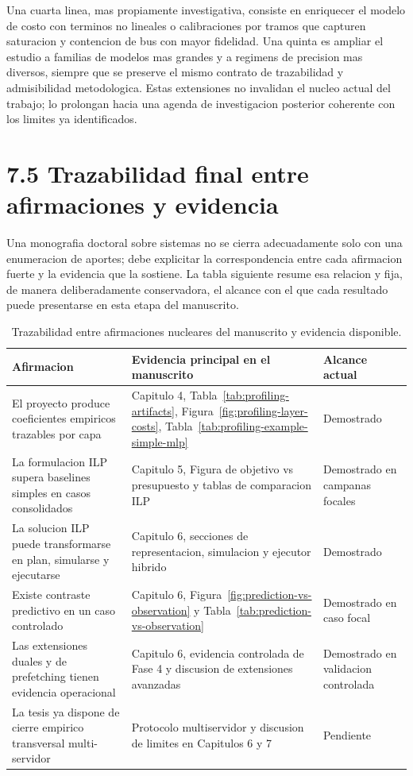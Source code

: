 Una cuarta linea, mas propiamente investigativa, consiste en enriquecer el modelo de costo con terminos no lineales o calibraciones por tramos que capturen saturacion y contencion de bus con mayor fidelidad. Una quinta es ampliar el estudio a familias de modelos mas grandes y a regimens de precision mas diversos, siempre que se preserve el mismo contrato de trazabilidad y admisibilidad metodologica. Estas extensiones no invalidan el nucleo actual del trabajo; lo prolongan hacia una agenda de investigacion posterior coherente con los limites ya identificados.

\section{7.5 Trazabilidad final entre afirmaciones y evidencia}
Una monografia doctoral sobre sistemas no se cierra adecuadamente solo con una enumeracion de aportes; debe explicitar la correspondencia entre cada afirmacion fuerte y la evidencia que la sostiene. La tabla siguiente resume esa relacion y fija, de manera deliberadamente conservadora, el alcance con el que cada resultado puede presentarse en esta etapa del manuscrito.

\begin{table}[t]
\centering
\caption{Trazabilidad entre afirmaciones nucleares del manuscrito y evidencia disponible.}
\label{tab:thesis-traceability}
\scriptsize
\setlength{\tabcolsep}{4pt}
\begin{tabularx}{\textwidth}{p{}X p{}}
\toprule
Afirmacion & Evidencia principal en el manuscrito & Alcance actual \\
\midrule
El proyecto produce coeficientes empiricos trazables por capa & Capitulo 4, Tabla~\ref{tab:profiling-artifacts}, Figura~\ref{fig:profiling-layer-costs}, Tabla~\ref{tab:profiling-example-simple-mlp} & Demostrado \\
La formulacion ILP supera baselines simples en casos consolidados & Capitulo 5, Figura de objetivo vs presupuesto y tablas de comparacion ILP & Demostrado en campanas focales \\
La solucion ILP puede transformarse en plan, simularse y ejecutarse & Capitulo 6, secciones de representacion, simulacion y ejecutor hibrido & Demostrado \\
Existe contraste predictivo en un caso controlado & Capitulo 6, Figura~\ref{fig:prediction-vs-observation} y Tabla~\ref{tab:prediction-vs-observation} & Demostrado en caso focal \\
Las extensiones duales y de prefetching tienen evidencia operacional & Capitulo 6, evidencia controlada de Fase 4 y discusion de extensiones avanzadas & Demostrado en validacion controlada \\
La tesis ya dispone de cierre empirico transversal multi-servidor & Protocolo multiservidor y discusion de limites en Capitulos 6 y 7 & Pendiente \\
\bottomrule
\end{tabularx}
\normalsize
\end{table}

